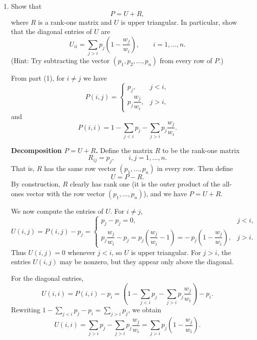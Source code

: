 \documentclass[answers,12pt,addpoints]{exam}
\begin{document}
\begin{enumerate}
\begin{solution}
\medskip
\noindent\textbf{Formula for $P(i,i)$.}
Finally, the probability of staying at $i$ is one minus the probability of
moving to any other state:
\[
P(i,i)
= 1 - \sum_{j\neq i} P(i,j)
= 1 - \sum_{j<i} p_j - \sum_{j>i} p_j\,\frac{w_j}{w_i}.
\]
This gives an explicit expression for $P(i,i)$ in terms of $\{p_j,w_j\}$.
\end{solution}
\item Show that
\[
P = U + R,
\]
where $R$ is a rank-one matrix and $U$ is upper triangular. In particular, show that the diagonal
entries of $U$ are
\[
U_{ii} = \sum_{j>i} p_j\left(1 - \frac{w_j}{w_i}\right),
\qquad i = 1,\ldots,n.
\]
(Hint: Try subtracting the vector $(p_1, p_2, \ldots, p_n)$ from every row of $P$.)
\begin{solution}
From part (1), for $i \neq j$ we have
\[
P(i,j) =
\begin{cases}
p_j, & j < i,\\[4pt]
p_j \dfrac{w_j}{w_i}, & j > i,
\end{cases}
\]
and
\[
P(i,i) = 1 - \sum_{j<i} p_j - \sum_{j>i} p_j \frac{w_j}{w_i}.
\]

\medskip
\noindent\textbf{Decomposition $P = U + R$.}
Define the matrix $R$ to be the rank-one matrix
\[
R_{ij} = p_j, \qquad i,j = 1,\dots,n.
\]
That is, $R$ has the same row vector $(p_1,\dots,p_n)$ in every row. Then define
\[
U = P - R.
\]
By construction, $R$ clearly has rank one (it is the outer product of the all-ones
vector with the row vector $(p_1,\dots,p_n)$), and we have $P = U + R$.

We now compute the entries of $U$. For $i \neq j$,
\[
U(i,j) = P(i,j) - p_j =
\begin{cases}
p_j - p_j = 0, & j < i,\\[6pt]
p_j \dfrac{w_j}{w_i} - p_j = p_j\!\left(\dfrac{w_j}{w_i} - 1\right)
= -\,p_j\!\left(1 - \dfrac{w_j}{w_i}\right), & j > i.
\end{cases}
\]
Thus $U(i,j) = 0$ whenever $j < i$, so $U$ is upper triangular. For $j>i$, the
entries $U(i,j)$ may be nonzero, but they appear only above the diagonal.

For the diagonal entries,
\[
U(i,i) = P(i,i) - p_i
= \left( 1 - \sum_{j<i} p_j - \sum_{j>i} p_j \frac{w_j}{w_i} \right) - p_i.
\]
Rewriting $1 - \sum_{j<i} p_j - p_i = \sum_{j>i} p_j$, we obtain
\[
U(i,i)
= \sum_{j>i} p_j - \sum_{j>i} p_j \frac{w_j}{w_i}
= \sum_{j>i} p_j\left(1 - \frac{w_j}{w_i}\right).
\]


\end{solution}
\end{enumerate}
\end{document}
